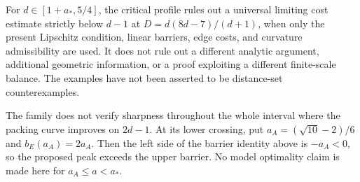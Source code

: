 \begin{remark}
For \(d\in[1+a_*,5/4]\), the critical profile rules out a universal limiting
cost estimate strictly below \(d-1\) at \(D=d(8d-7)/(d+1)\), when only the
present Lipschitz condition, linear barriers, edge costs, and curvature
admissibility are used. It does not rule out a different analytic argument,
additional geometric information, or a proof exploiting a different finite-scale
balance. The examples have not been asserted to be distance-set counterexamples.

The family does not verify sharpness throughout the whole interval where the
packing curve improves on \(2d-1\). At its lower crossing, put
\(a_A=(\sqrt{10}-2)/6\) and \(b_E(a_A)=2a_A\). Then the left side of the
barrier identity above is \(-a_A<0\), so the proposed peak exceeds the upper
barrier. No model optimality claim is made here for
\(a_A\le a<a_*\).
\end{remark}
